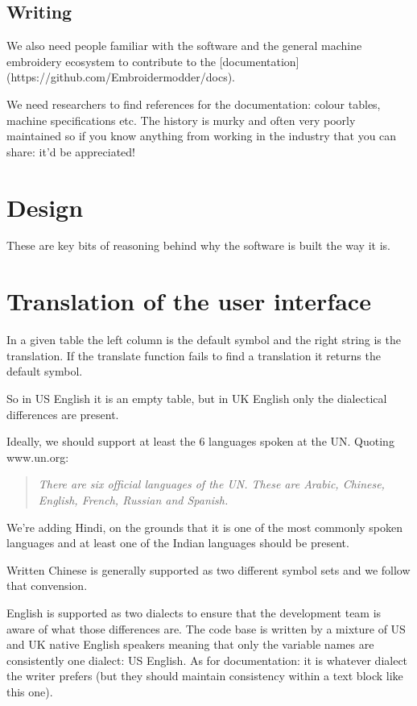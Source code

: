\documentclass{report}
\begin{document}
\subsection{Writing}

We also need people familiar with the software and the general
machine embroidery ecosystem to contribute to the
[documentation](https://github.com/Embroidermodder/docs).

We need researchers to find references for the documentation: colour tables,
machine specifications etc. The history is murky and often very poorly maintained
so if you know anything from working in the industry that you can share: it'd be
appreciated!

\section{Design}

These are key bits of reasoning behind why the software is built the way it is.

\section{Translation of the user interface}

In a given table the left column is the default symbol
and the right string is the translation. If the translate
function fails to find a translation it returns the default
symbol.

So in US English it is an empty table, but in UK English
only the dialectical differences are present.

Ideally, we should support at least the 6 languages spoken at the UN. Quoting www.un.org:

\begin{quote}
\emph{There are six official languages of the UN. These are Arabic, Chinese, English, French, Russian and Spanish.}
\end{quote}

We're adding Hindi, on the grounds that it is one of the most commonly spoken languages and at least one of the Indian languages should be present.

Written Chinese is generally supported as two different symbol sets and we follow that convension.

English is supported as two dialects to ensure that the development team is aware of what those differences are. The code base is written by a mixture of US and UK native English speakers meaning that only the variable names are consistently one dialect: US English. As for documentation: it is whatever dialect the writer prefers (but they should maintain consistency within a text block like this one).
\end{document}
